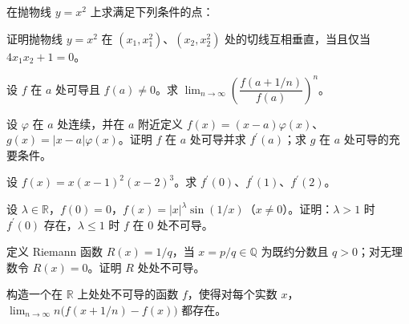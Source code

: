 \noindent\begin{minipage}{\textwidth}
在抛物线 $y=x^2$ 上求满足下列条件的点：
\end{minipage}\par\vfill
\newpage
\noindent\begin{minipage}{\textwidth}
证明抛物线 $y=x^2$ 在 $(x_1,x_1^2)$、$(x_2,x_2^2)$ 处的切线互相垂直，当且仅当 $4x_1x_2+1=0$。
\end{minipage}\par\vfill
\noindent\begin{minipage}{\textwidth}
设 $f$ 在 $a$ 处可导且 $f(a)\ne0$。求 $\lim_{n\to\infty}\left(\dfrac{f(a+1/n)}{f(a)}\right)^n$。
\end{minipage}\par\vfill
\noindent\begin{minipage}{\textwidth}
设 $\varphi$ 在 $a$ 处连续，并在 $a$ 附近定义 $f(x)=(x-a)\varphi(x)$、$g(x)=|x-a|\varphi(x)$。证明 $f$ 在 $a$ 处可导并求 $f^{\prime}(a)$；求 $g$ 在 $a$ 处可导的充要条件。
\end{minipage}\par\vfill
\newpage
\noindent\begin{minipage}{\textwidth}
设 $f(x)=x(x-1)^2(x-2)^3$。求 $f^{\prime}(0)$、$f^{\prime}(1)$、$f^{\prime}(2)$。
\end{minipage}\par\vfill
\noindent\begin{minipage}{\textwidth}
设 $\lambda\in\mathbb R$，$f(0)=0$，$f(x)=|x|^\lambda\sin(1/x)$（$x\ne0$）。证明：$\lambda>1$ 时 $f^{\prime}(0)$ 存在，$\lambda\le1$ 时 $f$ 在 $0$ 处不可导。
\end{minipage}\par\vfill
\noindent\begin{minipage}{\textwidth}
定义 Riemann 函数 $R(x)=1/q$，当 $x=p/q\in\mathbb Q$ 为既约分数且 $q>0$；对无理数令 $R(x)=0$。证明 $R$ 处处不可导。
\end{minipage}\par\vfill
\newpage
\noindent\begin{minipage}{\textwidth}
构造一个在 $\mathbb R$ 上处处不可导的函数 $f$，使得对每个实数 $x$，$\lim_{n\to\infty}n\bigl(f(x+1/n)-f(x)\bigr)$ 都存在。
\end{minipage}\par\vfill
